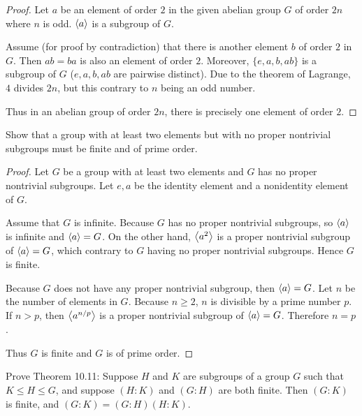 \begin{proof}
    Let $a$ be an element of order $2$ in the given abelian group $G$ of order $2n$ where $n$ is odd. $\left\langle{a}\right\rangle$ is a subgroup of $G$.

    Assume (for proof by contradiction) that there is another element $b$ of order $2$ in $G$. Then $ab = ba$ is also an element of order $2$. Moreover, $\{ e, a, b, ab \}$ is a subgroup of $G$ ($e, a, b, ab$ are pairwise distinct). Due to the theorem of Lagrange, $4$ divides $2n$, but this contrary to $n$ being an odd number.

    Thus in an abelian group of order $2n$, there is precisely one element of order $2$.
\end{proof}

\begin{exercise}
    Show that a group with at least two elements but with no proper nontrivial subgroups must be finite and of prime order.
\end{exercise}

\begin{proof}
    Let $G$ be a group with at least two elements and $G$ has no proper nontrivial subgroups. Let $e, a$ be the identity element and a nonidentity element of $G$.

    Assume that $G$ is infinite. Because $G$ has no proper nontrivial subgroups, so $\left\langle{a}\right\rangle$ is infinite and $\left\langle{a}\right\rangle = G$. On the other hand, $\left\langle{a^{2}}\right\rangle$ is a proper nontrivial subgroup of $\left\langle{a}\right\rangle = G$, which contrary to $G$ having no proper nontrivial subgroups. Hence $G$ is finite.

    Because $G$ does not have any proper nontrivial subgroup, then $\left\langle{a}\right\rangle = G$. Let $n$ be the number of elements in $G$. Because $n\geq 2$, $n$ is divisible by a prime number $p$. If $n > p$, then $\left\langle{a^{n/p}}\right\rangle$ is a proper nontrivial subgroup of $\left\langle{a}\right\rangle = G$. Therefore $n = p$.

    Thus $G$ is finite and $G$ is of prime order.
\end{proof}

\begin{exercise}
    Prove Theorem 10.11: Suppose $H$ and $K$ are subgroups of a group $G$ such that $K\leq H\leq G$, and suppose $(H:K)$ and $(G:H)$ are both finite. Then $(G:K)$ is finite, and $(G:K) = (G:H)(H:K)$.
\end{exercise}

